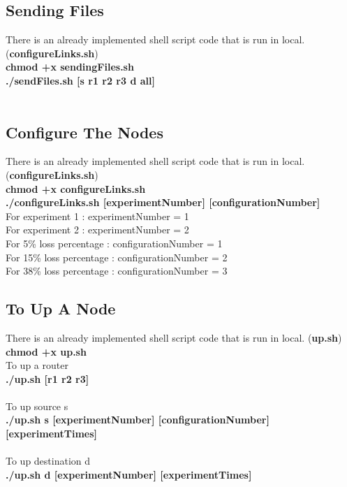 \documentclass[conference]{IEEEtran}
\begin{document}
\subsection{Sending Files}

There is an already implemented shell script code that is run in local.\\
(\textbf{configureLinks.sh}) \\
\textbf{chmod +x sendingFiles.sh} \\
\textbf{./sendFiles.sh [s \textbar r1 \textbar r2 \textbar r3 \textbar d \textbar all]} \\ \\

\subsection{Configure The Nodes}

There is an already implemented shell script code that is run in local. (\textbf{configureLinks.sh}) \\
\textbf{chmod +x configureLinks.sh} \\
\textbf{./configureLinks.sh [experimentNumber] [configurationNumber]} \\

For experiment 1 : experimentNumber = 1 \\
For experiment 2 : experimentNumber = 2 \\

For 5\% loss percentage : configurationNumber = 1 \\
For 15\% loss percentage : configurationNumber = 2 \\
For 38\% loss percentage : configurationNumber = 3 \\

\subsection{To Up A Node}

There is an already implemented shell script code that is run in local. (\textbf{up.sh}) \\
\textbf{chmod +x up.sh} \\
To up a router \\
\textbf{./up.sh [\textbar r1 \textbar r2 \textbar r3]} \\ \\
To up source s \\
\textbf{./up.sh s [experimentNumber] [configurationNumber] [experimentTimes]} \\ \\
To up destination d \\
\textbf{./up.sh d [experimentNumber] [experimentTimes] } \\
\end{document}
